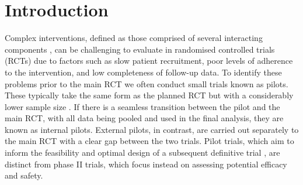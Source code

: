 \documentclass[AMA,STIX1COL]{WileyNJD-v2}
\begin{document}
\maketitle

\section{Introduction}\label{sec:introduction}

Complex interventions, defined as those comprised of several interacting components \cite{Craig2008}, can be challenging to evaluate in randomised controlled trials (RCTs) due to factors such as slow patient recruitment, poor levels of adherence to the intervention, and low completeness of follow-up data. To identify these problems prior to the main RCT we often conduct small trials \cite{Craig2008} known as pilots. These typically take the same form as the planned RCT but with a considerably lower sample size \cite{Eldridge2016}. If there is a seamless transition between the pilot and the main RCT, with all data being pooled and used in the final analysis, they are known as internal pilots. External pilots, in contrast, are carried out separately to the main RCT with a clear gap between the two trials. Pilot trials, which aim to inform the feasibility and optimal design of a subsequent definitive trial \cite{Lancaster2004}, are distinct from phase II trials, which focus instead on assessing potential efficacy and safety.




\end{document}

